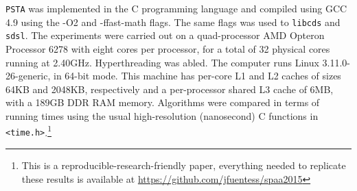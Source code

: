 {\tt PSTA} was implemented in the C programming language and
compiled using GCC 4.9 using the -O2 and -ffast-math flags. The same flags was used
to {\tt libcds} and {\tt sdsl}. The experiments were carried out on a quad-processor AMD Opteron\texttrademark{} Processor 6278
	 with eight cores per processor, for a total of 32 physical cores
running at 2.40GHz. Hyperthreading was abled. The computer runs
Linux 3.11.0-26-generic, in 64-bit mode. This machine has per-core L1
and L2 caches of sizes 64KB and 2048KB, respectively and a
per-processor shared L3 cache of 6MB, with a 189GB DDR
RAM memory. Algorithms were compared in terms of running times using
the usual high-resolution (nanosecond) C functions in {\tt
  <time.h>}.\footnote{This is a reproducible-research-friendly paper,
  everything needed to replicate these results is available at
  \url{https://github.com/jfuentess/spaa2015}}
